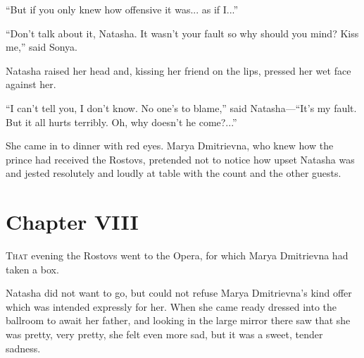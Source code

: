``But if you only knew how offensive it was... as if I...''

``Don't talk about it, Natasha. It wasn't your fault so why
should you mind? Kiss me,'' said Sonya.

Natasha raised her head and, kissing her friend on the lips,
pressed her wet face against her.

``I can't tell you, I don't know. No one's to blame,'' said
Natasha---``It's my fault. But it all hurts terribly. Oh, why
doesn't he come?...''

She came in to dinner with red eyes. Marya Dmitrievna, who knew
how the prince had received the Rostovs, pretended not to notice
how upset Natasha was and jested resolutely and loudly at table
with the count and the other guests.


\chapter*{Chapter VIII}
\ifaudio     
{} 
\fi

\lettrine[lines=2, loversize=0.3, lraise=0]{\initfamily T}{hat}
evening the Rostovs went to the Opera, for which Marya
Dmitrievna had taken a box.

Natasha did not want to go, but could not refuse Marya
Dmitrievna's kind offer which was intended expressly for
her. When she came ready dressed into the ballroom to await her
father, and looking in the large mirror there saw that she was
pretty, very pretty, she felt even more sad, but it was a sweet,
tender sadness.

